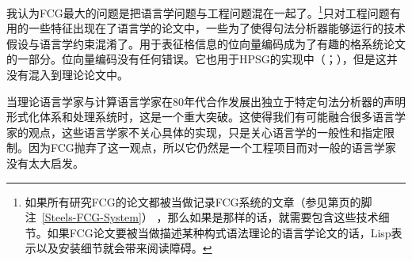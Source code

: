 我认为FCG最大的问题是把语言学问题与工程问题混在一起了。\footnote{%
如果所有研究FCG的论文都被当做记录FCG系统的文章（参见第\pageref{Steels-FCG-System}页的脚注~\ref{Steels-FCG-System}） ，那么如果是那样的话，就需要包含这些技术细节。如果FCG论文要被当做描述某种构式语法理论的语言学论文的话，Lisp表示以及安装细节就会带来阅读障碍。
}只对工程问题有用的一些特征出现在了语言学的论文中，一些为了使得句法分析器能够运行的技术假设与语言学约束混淆了。用于表征格信息的位向量编码成为了有趣的格系统论文的一部分。位向量编码没有任何错误。它也用于HPSG的实现中（\citealp[]{Reape91}；\citealp[]{Babel}），但是这并没有混入到理论论文中。

当理论语言学家与计算语言学家在80年代合作发展出独立于特定句法分析器的声明形式化体系和处理系统时，这是一个重大突破。这使得我们有可能融合很多语言学家的观点，这些语言学家不关心具体的实现，只是关心语言学的一般性和指定限制。因为FCG抛弃了这一观点，所以它仍然是一个工程项目而对一般的语言学家没有太大启发。
\indexhpsgend\indexsbcgend

